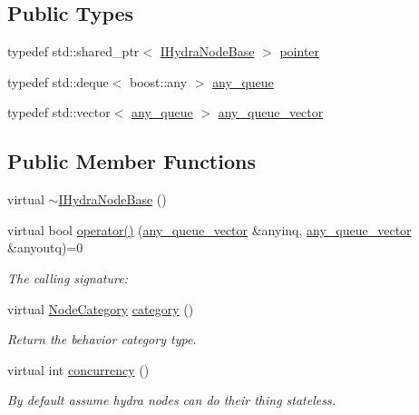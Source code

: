 \subsection*{Public Types}
\begin{DoxyCompactItemize}
\item 
typedef std\+::shared\+\_\+ptr$<$ \hyperlink{class_wire_cell_1_1_i_hydra_node_base}{I\+Hydra\+Node\+Base} $>$ \hyperlink{class_wire_cell_1_1_i_hydra_node_base_ae3fc165a8dc2b2cef91f5b475d1d409d}{pointer}
\item 
typedef std\+::deque$<$ boost\+::any $>$ \hyperlink{class_wire_cell_1_1_i_hydra_node_base_ae66b3516835d191befc31f7ad5fce5d1}{any\+\_\+queue}
\item 
typedef std\+::vector$<$ \hyperlink{class_wire_cell_1_1_i_hydra_node_base_ae66b3516835d191befc31f7ad5fce5d1}{any\+\_\+queue} $>$ \hyperlink{class_wire_cell_1_1_i_hydra_node_base_aab191670a86f2835da2aa07ab5e6372d}{any\+\_\+queue\+\_\+vector}
\end{DoxyCompactItemize}
\subsection*{Public Member Functions}
\begin{DoxyCompactItemize}
\item 
virtual \hyperlink{class_wire_cell_1_1_i_hydra_node_base_a639cab9b48e7af45d255d67ab41a6939}{$\sim$\+I\+Hydra\+Node\+Base} ()
\item 
virtual bool \hyperlink{class_wire_cell_1_1_i_hydra_node_base_a7840530686daf7ba07beaf74c68b3d02}{operator()} (\hyperlink{class_wire_cell_1_1_i_hydra_node_base_aab191670a86f2835da2aa07ab5e6372d}{any\+\_\+queue\+\_\+vector} \&anyinq, \hyperlink{class_wire_cell_1_1_i_hydra_node_base_aab191670a86f2835da2aa07ab5e6372d}{any\+\_\+queue\+\_\+vector} \&anyoutq)=0
\begin{DoxyCompactList}\small\item\em The calling signature\+: \end{DoxyCompactList}\item 
virtual \hyperlink{class_wire_cell_1_1_i_node_a5546e64cbb70bd3ac787295cac9ac803}{Node\+Category} \hyperlink{class_wire_cell_1_1_i_hydra_node_base_a92679ff7dc050dc051993655befae6c0}{category} ()
\begin{DoxyCompactList}\small\item\em Return the behavior category type. \end{DoxyCompactList}\item 
virtual int \hyperlink{class_wire_cell_1_1_i_hydra_node_base_a6bcaeb0a80fa720c3180d9b9d8b9fd22}{concurrency} ()
\begin{DoxyCompactList}\small\item\em By default assume hydra nodes can do their thing stateless. \end{DoxyCompactList}\end{DoxyCompactItemize}


